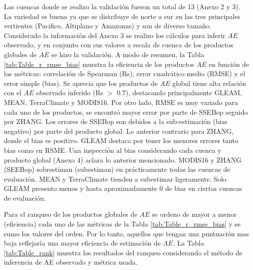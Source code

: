 \documentclass[12pt]{article}
\begin{document}
Las cuencas donde se realizo la validación fueron un total de 13 (Anexo 2 y 3). La variedad es buena ya que se distribuye de norte a sur en las tres principales vertientes (Pacifico, Altiplano y Amazonas) y son de diverso tamaño. Considerado la información del Anexo 3 se realizo los cálculos para inferir $AE$ observado, y en conjunto con sus valores a escala de cuenca de los productos globales de $AE$ se hizo la validación. A modo de resumen, la Tabla \ref{tab:Table_r_rmse_bias} muestra la eficiencia de los productos $AE$ en función de las métricas: correlación de Spearman (Rs), error cuadrático medio (RMSE) y el error simple (bias). Se aprecia que los productos de $AE$ global tiene alta relación con el $AE$ observado inferido (Rs $>$ 0.7), destacando principalmente GLEAM, MEAN, TerraClimate y MODIS16. Por otro lado, RMSE es muy variado para cada uno de los productos, se encontró mayor error por parte de SSEBop seguido por ZHANG. Los errores de SSEBop son debidos a la sub-estimación (bias negativo) por parte del producto global. Lo anterior contrario para ZHANG, donde el bias es positivo. GLEAM destaca por tener los menores errores tanto bias como en RSME. Una inspección al bias considerando cada cuenca y producto global (Anexo 4) aclara lo anterior mencionado. MODIS16 y ZHANG (SEEBop) sobrestiman (subestiman) en prácticamente todas las cuencas de evaluación. MEAN y TerraClimate tienden a subestimar ligeramente. Solo GLEAM presento menos y hasta aproximadamente 0 de bias en ciertas cuencas de evaluación.



Para el ranqueo de los productos globales de $AE$ se ordeno de mayor a menor (eficiencia) cada uno de las métricas de la Tabla \ref{tab:Table_r_rmse_bias} y se sumo los valores del orden. Por lo tanto, aquellos que tengan una puntuación mas baja reflejaría una mayor eficiencia de estimación de $AE$. La Tabla \ref{tab:Table_rank} muestra los resultados del ranqueo considerando el método de inferencia de AE observado y métrica usada. 


\end{document}
